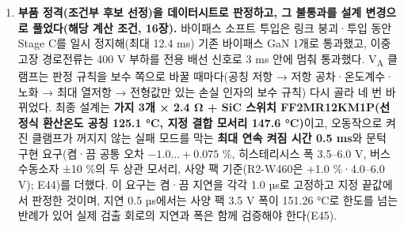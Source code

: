 \begin{enumerate}[label=\arabic*.]
\item \textbf{부품 정격(조건부 후보 선정)을 데이터시트로 판정하고, 그 불통과를 설계 변경으로 풀었다(해당 계산 조건, 16장).} 바이패스 소프트 투입은 링크 붕괴·투입 동안 Stage C를 일시 정지해(최대 12.4 ms) 기존 바이패스 GaN 1개로 통과했고, 이중 고장 경로전류는 400 V 부하를 전용 배선 신호로 3 ms 안에 멈춰 통과했다. V\textsubscript{A} 클램프는 판정 규칙을 보수 쪽으로 바꿀 때마다(공칭 저항 → 저항 공차·온도계수·노화 → 최대 열저항 → 전형값만 있는 손실 인자의 보수 규칙) 다시 골라 네 번 바뀌었다. 최종 설계는 \textbf{가지 3개 × 2.4 Ω + SiC 스위치 FF2MR12KM1P(선정식 환산온도 공칭 125.1 °C, 지정 결합 모서리 147.6 °C)}이고, 오동작으로 켜진 클램프가 꺼지지 않는 실패 모드를 막는 \textbf{최대 연속 켜짐 시간 0.5 ms}와 문턱 구현 요구(켬·끔 공통 오차 $-1.0 \ldots +0.075$ \%, 히스테리시스 폭 3.5–6.0 V, 버스 수동소자 ±10 \%의 두 상관 모서리, 사양 팩 기준(R2-W460은 +1.0 \%·4.0–6.0 V); E44)를 더했다. 이 요구는 켬·끔 지연을 각각 1.0 µs로 고정하고 지정 끝값에서 판정한 것이며, 지연 0.5 µs에서는 사양 팩 3.5 V 폭이 151.26 °C로 한도를 넘는 반례가 있어 실제 검출 회로의 지연과 폭은 함께 검증해야 한다(E45).
\end{enumerate}


